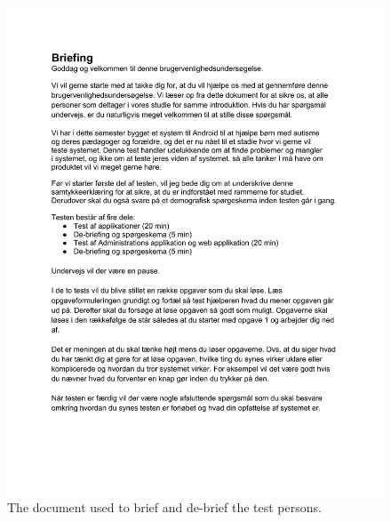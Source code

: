 \begin{figure}[H]
	\begin{center}
	\includegraphics[width=\textwidth]{Appendix/Briefingogde-briefing}
	\end{center}
\caption{The document used to brief and de-brief the test persons.}
\label{fig:brief_debrief}
\end{figure}



